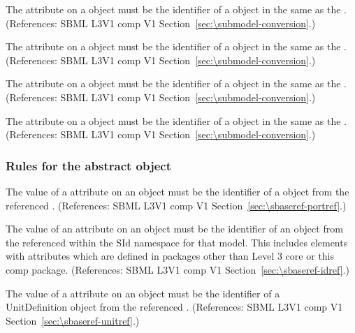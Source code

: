 \begin{sbmlenum}
 { The  attribute
   on a \Submodel object must be the identifier of a \Parameter object in the 
   same \Model as the \Submodel.
  (References: SBML L3V1 comp V1 Section~\ref{sec:\submodel-conversion}.) }


 { The  attribute
   on a \Submodel object must be the identifier of a \Parameter object in the 
   same \Model as the \Submodel.
  (References: SBML L3V1 comp V1 Section~\ref{sec:\submodel-conversion}.) }


 { The  attribute
   on a \Submodel object must be the identifier of a \Parameter object in the 
   same \Model as the \Submodel.
  (References: SBML L3V1 comp V1 Section~\ref{sec:\submodel-conversion}.) }


 { The  attribute
   on a \Submodel object must be the identifier of a \Parameter object in the 
   same \Model as the \Submodel.
  (References: SBML L3V1 comp V1 Section~\ref{sec:\submodel-conversion}.) }


\end{sbmlenum} \subsubsection*{Rules for the  abstract object} \begin{sbmlenum}

 { The value of a  attribute on an \SBaseRef
  object must be the identifier of a \Port object from the referenced
  \Model.  
  (References: SBML L3V1 comp V1 Section~\ref{sec:\sbaseref-portref}.) }


 { The value of an  attribute on an \SBaseRef
  object must be the identifier of an object from the referenced \Model
  within the SId namespace for that model.  This includes elements with
   attributes which are defined in packages other than Level 3 core or
  this comp package. 
  (References: SBML L3V1 comp V1 Section~\ref{sec:\sbaseref-idref}.) }


 { The value of a  attribute on an \SBaseRef
  object must be the identifier of a \\UnitDefinition object from the
  referenced \Model.  
  (References: SBML L3V1 comp V1 Section~\ref{sec:\sbaseref-unitref}.) }



\end{sbmlenum}
